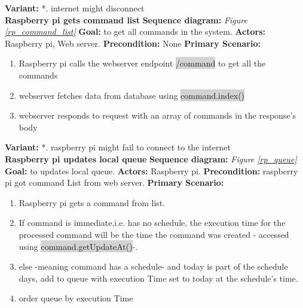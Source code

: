 \documentclass[12pt, oneside, a4paper]{book}
\newcommand{\code}[1]{{\color{red}\colorbox{lightgray}{#1}}}
\newcommand\boldcolor[1]{\textcolor{bold}{\textbf{#1}}}
\begin{document}
				\textbf{Variant:}\newline
				\hspace*{5mm}*. internet might disconnect\\
				\newline\boldcolor{Raspberry pi gets command list}
				\newline\textbf{Sequence diagram:} \textit{Figure \ref{rp_command_list}}
				\newline\textbf{Goal:} to get all commands in the system.
				\newline\textbf{Actors:} Raspberry pi, Web server.
				\newline\textbf{Precondition:} None
				\newline\textbf{Primary Scenario:}	
				\begin{enumerate}[label*=\arabic*.]
					\item Raspberry pi calls the webserver endpoint \code{/command} to get all the commands
					\item webserver fetches data from database using \code{command.index()}
					\item webserver responds to request with an array of commands in the response's body
				\end{enumerate}
				\textbf{Variant:}\newline
				\hspace*{5mm}*. raspberry pi might fail to connect to the internet \\
				\newline\boldcolor{Raspberry pi updates local queue}
				\newline\textbf{Sequence diagram:} \textit{Figure \ref{rp_queue}}
				\newline\textbf{Goal:} to updates local queue.
				\newline\textbf{Actors:} Raspberry pi.
				\newline\textbf{Precondition:} raspberry pi got  command List from web server.
				\newline\textbf{Primary Scenario:}	
				\begin{enumerate}[label*=\arabic*.]
					\item Raspberry pi gets a command from list.
					\item If command is immediate,i.e. has no schedule, the execution time for the processed command will be the time the command was created - accessed using  \code{command.getUpdateAt()}-.
					\item else -meaning command has a schedule- and today is part of the schedule days, add to queue with execution Time set to today at the schedule's time.
					\item order queue by execution Time
				\end{enumerate}
\end{document}

